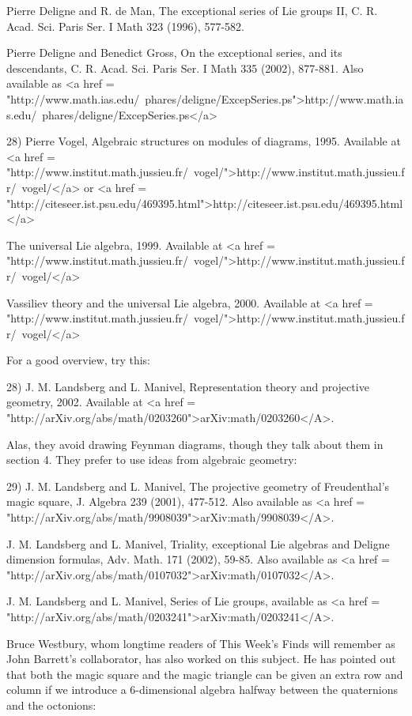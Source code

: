 Pierre Deligne and R. de Man, The exceptional series of Lie groups II,
C. R. Acad. Sci. Paris Ser. I Math 323 (1996), 577-582.

Pierre Deligne and Benedict Gross, On the exceptional series, and its 
descendants, C. R. Acad. Sci. Paris Ser. I Math 335 (2002), 877-881.
Also available as <a href = "http://www.math.ias.edu/~phares/deligne/ExcepSeries.ps">http://www.math.ias.edu/~phares/deligne/ExcepSeries.ps</a>

28) Pierre Vogel, Algebraic structures on modules of diagrams, 1995.
Available at <a href = "http://www.institut.math.jussieu.fr/~vogel/">http://www.institut.math.jussieu.fr/~vogel/</a>
or
<a href = "http://citeseer.ist.psu.edu/469395.html">http://citeseer.ist.psu.edu/469395.html</a>

The universal Lie algebra, 1999.  Available at
<a href = "http://www.institut.math.jussieu.fr/~vogel/">http://www.institut.math.jussieu.fr/~vogel/</a>

Vassiliev theory and the universal Lie algebra, 2000.  
Available at <a href = "http://www.institut.math.jussieu.fr/~vogel/">http://www.institut.math.jussieu.fr/~vogel/</a>

For a good overview, try this:

28) J. M. Landsberg and L. Manivel, Representation theory and projective
geometry, 2002.  Available at <a href = "http://arXiv.org/abs/math/0203260">arXiv:math/0203260</A>.

Alas, they avoid drawing Feynman diagrams, though they talk about them
in section 4.  They prefer to use ideas from algebraic geometry:

29) J. M. Landsberg and L. Manivel, The projective geometry of 
Freudenthal's magic square, J. Algebra 239 (2001), 477-512.  Also 
available as <a href = "http://arXiv.org/abs/math/9908039">arXiv:math/9908039</A>.

J. M. Landsberg and L. Manivel, Triality, exceptional Lie algebras and
Deligne dimension formulas, Adv. Math. 171 (2002), 59-85.  Also 
available as <a href = "http://arXiv.org/abs/math/0107032">arXiv:math/0107032</A>.

J. M. Landsberg and L. Manivel, Series of Lie groups, available 
as <a href = "http://arXiv.org/abs/math/0203241">arXiv:math/0203241</A>.

Bruce Westbury, whom longtime readers of This Week's Finds will
remember as John Barrett's collaborator, has also worked on this
subject.  He has pointed out that both the magic square and the
magic triangle can be given an extra row and column if we introduce
a 6-dimensional algebra halfway between the quaternions and the
octonions:


